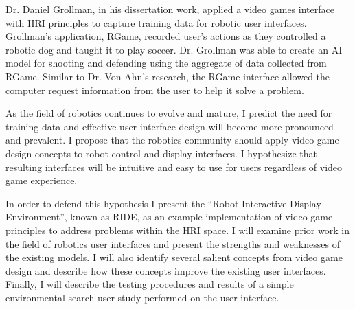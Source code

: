 Dr. Daniel Grollman, in his dissertation work, applied a video games interface with HRI principles to capture training data for robotic user interfaces. \cite{Grollman} Grollman's application, RGame, recorded user’s actions as they controlled a robotic dog and taught it to play soccer. Dr. Grollman was able to create an AI model for shooting and defending using the aggregate of data collected from RGame. Similar to Dr. Von Ahn's research, the RGame interface allowed the computer request information from the user to help it solve a problem.

As the field of robotics continues to evolve and mature, I predict the need for training data and effective user interface design will become more pronounced and prevalent. I propose that the robotics community should apply video game design concepts to robot control and display interfaces. I hypothesize that resulting interfaces will be intuitive and easy to use for users regardless of video game experience.

In order to defend this hypothesis I present the ``Robot Interactive Display Environment'', known as RIDE, as an example implementation of video game principles to address problems within the HRI space. I will examine prior work in the field of robotics user interfaces and present the strengths and weaknesses of the existing models. I will also identify several salient concepts from video game design and describe how these concepts improve the existing user interfaces. Finally, I will describe the testing procedures and results of a simple environmental search user study performed on the user interface.

